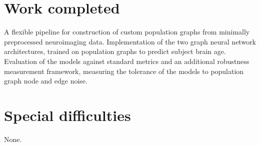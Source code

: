 
\section*{Work completed}
A flexible pipeline for construction of custom population graphs from minimally preprocessed neuroimaging data. Implementation of the two graph neural network architectures, trained on population graphs to predict subject brain age. Evaluation of the models against standard metrics and an additional robustness measurement framework, measuring the tolerance of the models to population graph node and edge noise.

\section*{Special difficulties}

None.

\tableofcontents


